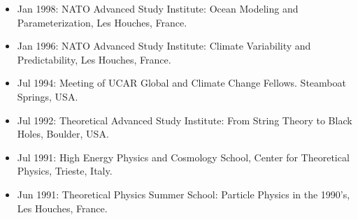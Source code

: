\documentclass{article}
\begin{document}
\begin{itemize}[leftmargin=*]

\item Jan 1998: NATO Advanced Study Institute: {\sc Ocean Modeling and Parameterization}, Les Houches, France.

\item Jan 1996: NATO Advanced Study Institute: {\sc Climate
  Variability and Predictability}, Les Houches, France.

\item Jul 1994: Meeting of UCAR Global and Climate Change Fellows. Steamboat Springs, USA.  

\item Jul 1992: Theoretical Advanced Study Institute: {\sc From String Theory to Black Holes}, Boulder, USA.

\item Jul 1991: High Energy Physics and Cosmology School, Center for Theoretical Physics, Trieste, Italy.

\item Jun 1991: Theoretical Physics Summer School: {\sc Particle Physics in the 1990's}, Les Houches, France.

\end{itemize}


%

\end{document}
